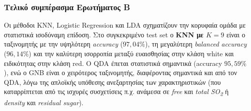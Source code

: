 \documentclass[11pt,a4paper]{article}
\begin{document}
\subsubsection*{Τελικό συμπέρασμα Ερωτήματος Β}

Οι μέθοδοι KNN, Logistic Regression και LDA σχηματίζουν την κορυφαία
ομάδα με στατιστικά ισοδύναμη επίδοση. Στο συγκεκριμένο test set ο
\textbf{KNN με $K = 9$} είναι ο ταξινομητής με την υψηλότερη
\textit{accuracy} ($97{,}04\%$), τη μεγαλύτερη \textit{balanced
accuracy} ($96{,}14\%$) και την καλύτερη ισορροπία μεταξύ ευαισθησίας
στην κλάση white και ειδικότητας στην κλάση red. Ο QDA έπεται
στατιστικά σημαντικά (accuracy $95{,}59\%$), ενώ ο GNB είναι ο
χειρότερος ταξινομητής, διαφέροντας σημαντικά και από τον QDA, λόγω
της απλοϊκής υπόθεσης ανεξαρτησίας των χαρακτηριστικών (που
καταρρίπτεται από τις ισχυρές συσχετίσεις π.χ. ανάμεσα σε
\textit{free} και \textit{total SO\textsubscript{2}} ή
\textit{density} και \textit{residual sugar}).
\end{document}

